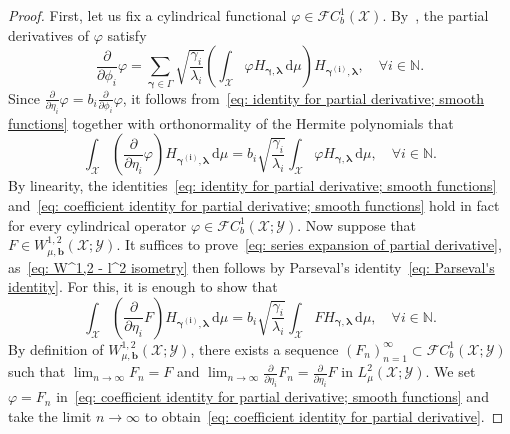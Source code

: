 \documentclass[namedate,webpdf]{ima-authoring-template-blank}
\def\D{\,\mathrm{d}}
\numberwithin{counter}{section}
\numberwithin{equation}{section}
\theoremstyle{plain}
\theoremstyle{definition}
\newcommand*{\cF}{\mathcal{F}}
\newcommand*{\cX}{\mathcal{X}}
\newcommand*{\cY}{\mathcal{Y}}
\newcommand*{\bbN}{\mathbb{N}}
\theoremstyle{thmstyletwo}
\begin{document}
\begin{proof}
    First, let us fix a cylindrical functional \(\varphi \in \cF C_b^1(\cX)\). By~\citet[Lemma 10.14]{daprato_IntroductionInfiniteDimensionalAnalysis_2006}, the partial derivatives of \(\varphi\) satisfy
    \begin{equation}
    \label{eq: identity for partial derivative; smooth functions}
        \frac{\partial}{\partial \phi_i} \varphi = \sum_{\bm{\gamma} \in \Gamma} \sqrt{\frac{\gamma_i}{\lambda_i}} \left( \int_{\cX} \varphi H_{\bm{\gamma}, \bm{\lambda}} \D \mu \right) H_{\bm{\gamma}^{\bm{(i)}}, \bm{\lambda}},
        \quad \forall i \in \bbN.
    \end{equation}
    Since \(\frac{\partial}{\partial \eta_i} \varphi = b_i \frac{\partial}{\partial \phi_i} \varphi\), it follows from~\eqref{eq: identity for partial derivative; smooth functions} together with orthonormality of the Hermite polynomials that
    \begin{equation}
    \label{eq: coefficient identity for partial derivative; smooth functions}
        \int_{\cX} \left(\frac{\partial}{\partial \eta_i} \varphi\right) H_{\bm{\gamma}^{\bm{(i)}}, \bm{\lambda}}
        \D \mu = b_i \sqrt{\frac{\gamma_i}{\lambda_i}} \int_{\cX} \varphi H_{\bm{\gamma}, \bm{\lambda}} \D \mu, \quad \forall i \in \bbN.
    \end{equation}
    By linearity, the identities~\eqref{eq: identity for partial derivative; smooth functions} and~\eqref{eq: coefficient identity for partial derivative; smooth functions} hold in fact for every cylindrical operator \(\varphi \in \cF C_b^1(\cX; \cY)\).
    Now suppose that \(F \in W_{\mu, \bm{b}}^{1,2}(\cX; \cY)\). It suffices to prove~\eqref{eq: series expansion of partial derivative}, as~\eqref{eq: W^1,2 - l^2 isometry} then follows by Parseval's identity~\eqref{eq: Parseval's identity}. For this, it is enough to show that
    \begin{equation}
    \label{eq: coefficient identity for partial derivative}
        \int_{\cX} \left(\frac{\partial}{\partial \eta_i} F\right) H_{\bm{\gamma}^{\bm{(i)}}, \bm{\lambda}}
        \D \mu = b_i \sqrt{\frac{\gamma_i}{\lambda_i}} \int_{\cX} F H_{\bm{\gamma}, \bm{\lambda}} \D \mu, \quad \forall i \in \bbN.
    \end{equation}
    By definition of \(W_{\mu, \bm{b}}^{1,2}(\cX; \cY)\), there exists a sequence \((F_n)_{n = 1}^{\infty} \subset \cF C_b^1(\cX; \cY)\) such that \(\lim_{n \to \infty} F_n = F\) and \(\lim_{n \to \infty} \frac{\partial}{\partial \eta_i} F_n = \frac{\partial}{\partial\eta_i} F\) in \(L_{\mu}^2(\cX; \cY)\). We set \(\varphi = F_n\) in~\eqref{eq: coefficient identity for partial derivative; smooth functions} and take the limit \(n \to \infty\) to obtain~\eqref{eq: coefficient identity for partial derivative}.


\end{proof}
\end{document}
